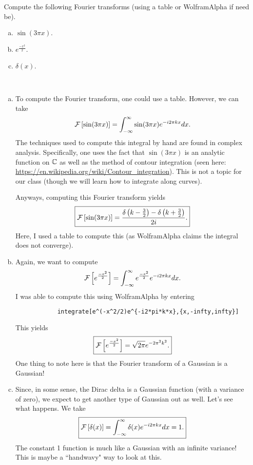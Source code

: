 \documentclass[12pt]{article} %
\begin{document}
\newpage
\begin{problem}
Compute the following Fourier transforms (using a table or WolframAlpha if need be).  
\begin{enumerate}[(a)]
	\item $\sin(3\pi x)$.
	\item $e^{\frac{-x^2}{2}}$.
	\item $\delta(x)$.
\end{enumerate}
\end{problem}
\begin{solution}~
	\begin{enumerate}[(a)]
		\item To compute the Fourier transform, one could use a table. However, we can take
		\[
		\mathcal{F}\left[ \sin(3\pi x) \right] = \int_{-\infty}^\infty \sin(3\pi x)e^{-i2\pi kx}dx.
		\]
		The techniques used to compute this integral by hand are found in complex analysis. Specifically, one uses the fact that $\sin(3\pi x)$ is an analytic function on $\mathbb{C}$ as well as the method of contour integration (seen here: \url{https://en.wikipedia.org/wiki/Contour_integration}). This is not a topic for our class (though we will learn how to integrate along curves).
		
		Anyways, computing this Fourier transform yields
		\[
		\boxed{\mathcal{F}\left[ \sin(3\pi x) \right] = \frac{\delta\left(k-\frac{3}{2}\right)-\delta\left(k+\frac{3}{2}\right)}{2i}.}
		\] 
		Here, I used a table to compute this (as WolframAlpha claims the integral does not converge).
		\item Again, we want to compute
		\[
		\mathcal{F}\left[ e^{\frac{-x^2}{2}} \right] = \int_{-\infty}^\infty e^{\frac{-x^2}{2}}e^{-i2\pi kx}dx.
		\]
		I was able to compute this using WolframAlpha by entering
		\begin{verbatim}
			integrate[e^(-x^2/2)e^{-i2*pi*k*x},{x,-infty,infty}]
		\end{verbatim}
		This yields
		\[
		\boxed{\mathcal{F}\left[ e^{\frac{-x^2}{2}} \right] = \sqrt{2\pi}e^{-2\pi^2k^2}.}
		\]
		One thing to note here is that the Fourier transform of a Gaussian is a Gaussian!
		\item Since, in some sense, the Dirac delta is a Gaussian function (with a variance of zero), we expect to get another type of Gaussian out as well. Let's see what happens. We take
		\begin{align*}
			\boxed{\mathcal{F}\left[ \delta(x) \right] = \int_{-\infty}^\infty \delta(x) e^{-i2\pi k x}dx = 1.}
		\end{align*}
		The constant 1 function is much like a Gaussian with an infinite variance! This is maybe a ``handwavy" way to look at this.
		\end{enumerate}
\end{solution}
\end{document}
